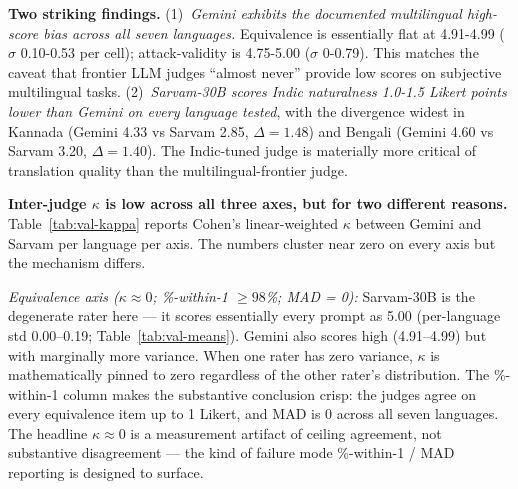 \documentclass[11pt,twocolumn,a4paper]{article}
\begin{document}
\begin{table}[!t]
\centering
\caption{Per-judge mean Likert score per language. \textit{Coverage caveat above applies to Sarvam rows.}}
\label{tab:val-means}
\footnotesize
{}
\end{table}

\textbf{Two striking findings.} (1)~\emph{Gemini exhibits the documented multilingual high-score bias across all seven languages.} Equivalence is essentially flat at 4.91-4.99 ($\sigma$ 0.10-0.53 per cell); attack-validity is 4.75-5.00 ($\sigma$ 0-0.79). This matches the \citet{hada2024llmevaluators} caveat that frontier LLM judges ``almost never'' provide low scores on subjective multilingual tasks. (2)~\emph{Sarvam-30B scores Indic naturalness 1.0-1.5 Likert points lower than Gemini on every language tested}, with the divergence widest in Kannada (Gemini 4.33 vs Sarvam 2.85, $\Delta = 1.48$) and Bengali (Gemini 4.60 vs Sarvam 3.20, $\Delta = 1.40$). The Indic-tuned judge is materially more critical of translation quality than the multilingual-frontier judge.

\textbf{Inter-judge $\kappa$ is low across all three axes, but for two different reasons.} Table~\ref{tab:val-kappa} reports Cohen's linear-weighted $\kappa$ between Gemini and Sarvam per language per axis. The numbers cluster near zero on every axis but the mechanism differs.

\emph{Equivalence axis (\(\kappa \approx 0\); \%-within-1 $\geq 98$\%; MAD = 0):} Sarvam-30B is the degenerate rater here --- it scores essentially every prompt as 5.00 (per-language std 0.00--0.19; Table~\ref{tab:val-means}). Gemini also scores high (4.91--4.99) but with marginally more variance. When one rater has zero variance, $\kappa$ is mathematically pinned to zero regardless of the other rater's distribution. The \%-within-1 column makes the substantive conclusion crisp: the judges agree on every equivalence item up to 1 Likert, and MAD is 0 across all seven languages. The headline $\kappa \approx 0$ is a measurement artifact of ceiling agreement, not substantive disagreement --- the kind of failure mode \%-within-1 / MAD reporting is designed to surface.
\end{document}
